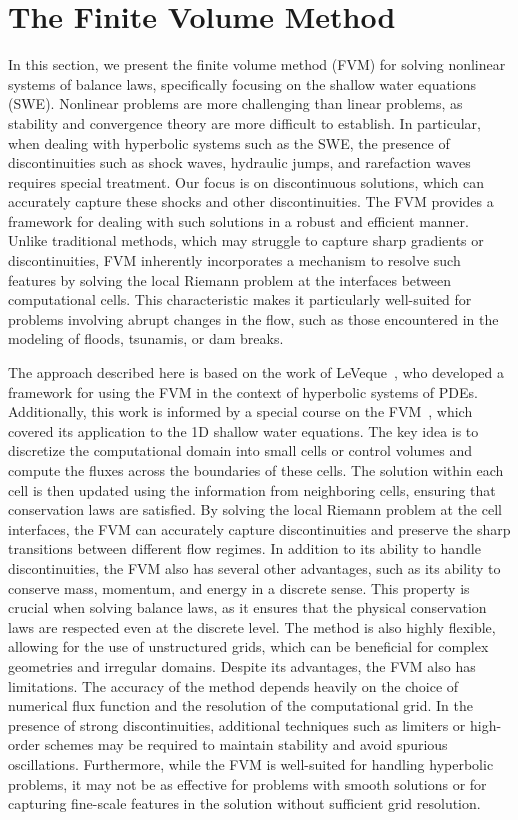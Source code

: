 \chapter{The Finite Volume Method}\label{ch:fvm}
In this section, we present the finite volume method (FVM) for solving nonlinear systems of balance laws, specifically focusing on the shallow water equations (SWE).
Nonlinear problems are more challenging than linear problems, as stability and convergence theory are more difficult to establish.
In particular, when dealing with hyperbolic systems such as the SWE, the presence of discontinuities such as shock waves, hydraulic jumps, and rarefaction waves requires special treatment.
Our focus is on discontinuous solutions, which can accurately capture these shocks and other discontinuities.
The FVM provides a framework for dealing with such solutions in a robust and efficient manner.
Unlike traditional methods, which may struggle to capture sharp gradients or discontinuities, FVM inherently incorporates a mechanism to resolve such features by solving the local Riemann problem at the interfaces between computational cells.
This characteristic makes it particularly well-suited for problems involving abrupt changes in the flow, such as those encountered in the modeling of floods, tsunamis, or dam breaks.

The approach described here is based on the work of LeVeque~\cite{LeVeque2002}, who developed a framework for using the FVM in the context of hyperbolic systems of PDEs.
Additionally, this work is informed by a special course on the FVM~\cite{special_course}, which covered its application to the 1D shallow water equations.
The key idea is to discretize the computational domain into small cells or control volumes and compute the fluxes across the boundaries of these cells.
The solution within each cell is then updated using the information from neighboring cells, ensuring that conservation laws are satisfied.
By solving the local Riemann problem at the cell interfaces, the FVM can accurately capture discontinuities and preserve the sharp transitions between different flow regimes.
In addition to its ability to handle discontinuities, the FVM also has several other advantages, such as its ability to conserve mass, momentum, and energy in a discrete sense.
This property is crucial when solving balance laws, as it ensures that the physical conservation laws are respected even at the discrete level.
The method is also highly flexible, allowing for the use of unstructured grids, which can be beneficial for complex geometries and irregular domains.
Despite its advantages, the FVM also has limitations. The accuracy of the method depends heavily on the choice of numerical flux function and the resolution of the computational grid.
In the presence of strong discontinuities, additional techniques such as limiters or high-order schemes may be required to maintain stability and avoid spurious oscillations.
Furthermore, while the FVM is well-suited for handling hyperbolic problems, it may not be as effective for problems with smooth solutions or for capturing fine-scale features in the solution without sufficient grid resolution.

